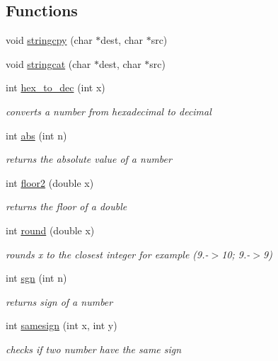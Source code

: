 \subsection*{Functions}
\begin{DoxyCompactItemize}
\item 
void \hyperlink{group__utilities_gaf3cb5100a651058103311c52a27b4105}{stringcpy} (char $\ast$dest, char $\ast$src)
\item 
void \hyperlink{group__utilities_ga971bb40926a0f370263e085d1e2ac690}{stringcat} (char $\ast$dest, char $\ast$src)
\item 
int \hyperlink{group__utilities_gaa662bd9797d0cdd2707c9ad14849be44}{hex\+\_\+to\+\_\+dec} (int x)
\begin{DoxyCompactList}\small\item\em converts a number from hexadecimal to decimal \end{DoxyCompactList}\item 
int \hyperlink{group__utilities_gafd4f329c8efb45c0dfff44525047a0fa}{abs} (int n)
\begin{DoxyCompactList}\small\item\em returns the absolute value of a number \end{DoxyCompactList}\item 
int \hyperlink{group__utilities_ga529fd7b4e2b2f87cec4a30c191673207}{floor2} (double x)
\begin{DoxyCompactList}\small\item\em returns the floor of a double \end{DoxyCompactList}\item 
int \hyperlink{group__utilities_ga35abf8e6bc22bc3736fbd65416d8c3a2}{round} (double x)
\begin{DoxyCompactList}\small\item\em rounds x to the closest integer for example (9.-\/$>$10; 9.-\/$>$9) \end{DoxyCompactList}\item 
int \hyperlink{group__utilities_ga67452a3b663c47b61edb379f159ae478}{sgn} (int n)
\begin{DoxyCompactList}\small\item\em returns sign of a number \end{DoxyCompactList}\item 
int \hyperlink{group__utilities_ga92a937ad6b303c03cc98f5fe9354d235}{samesign} (int x, int y)
\begin{DoxyCompactList}\small\item\em checks if two number have the same sign \end{DoxyCompactList}\item 

\end{DoxyCompactItemize}
